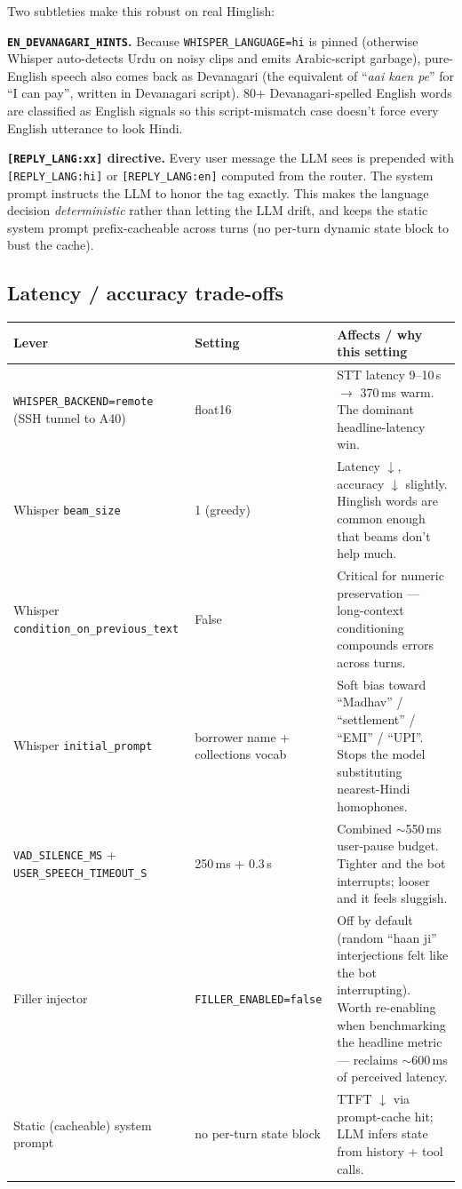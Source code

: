 \documentclass[11pt,a4paper]{article}
\begin{document}
Two subtleties make this robust on real Hinglish:

\textbf{\texttt{EN\_DEVANAGARI\_HINTS}.} Because \texttt{WHISPER\_LANGUAGE=hi} is pinned (otherwise Whisper auto-detects Urdu on noisy clips and emits Arabic-script garbage), pure-English speech also comes back as Devanagari (the equivalent of ``\textit{aai kaen pe}'' for ``I can pay'', written in Devanagari script). 80+ Devanagari-spelled English words are classified as English signals so this script-mismatch case doesn't force every English utterance to look Hindi.

\textbf{\texttt{[REPLY\_LANG:xx]} directive.} Every user message the LLM sees is prepended with \texttt{[REPLY\_LANG:hi]} or \texttt{[REPLY\_LANG:en]} computed from the router. The system prompt instructs the LLM to honor the tag exactly. This makes the language decision \emph{deterministic} rather than letting the LLM drift, and keeps the static system prompt prefix-cacheable across turns (no per-turn dynamic state block to bust the cache).

\subsection*{Latency / accuracy trade-offs}

\begin{tabular}{@{}p{4.5cm} p{4.0cm} p{6.5cm}@{}}
\toprule
\textbf{Lever} & \textbf{Setting} & \textbf{Affects / why this setting}\\
\midrule
\texttt{WHISPER\_BACKEND=remote} (SSH tunnel to A40) & float16 & STT latency 9--10\,s $\rightarrow$ 370\,ms warm. The dominant headline-latency win.\\
Whisper \texttt{beam\_size} & 1 (greedy) & Latency $\downarrow$, accuracy $\downarrow$ slightly. Hinglish words are common enough that beams don't help much.\\
Whisper \texttt{condition\_on\_previous\_text} & False & Critical for numeric preservation --- long-context conditioning compounds errors across turns.\\
Whisper \texttt{initial\_prompt} & borrower name + collections vocab & Soft bias toward ``Madhav'' / ``settlement'' / ``EMI'' / ``UPI''. Stops the model substituting nearest-Hindi homophones.\\
\texttt{VAD\_SILENCE\_MS} + \texttt{USER\_SPEECH\_TIMEOUT\_S} & 250\,ms + 0.3\,s & Combined $\sim$550\,ms user-pause budget. Tighter and the bot interrupts; looser and it feels sluggish.\\
Filler injector & \texttt{FILLER\_ENABLED=false} & Off by default (random ``haan ji'' interjections felt like the bot interrupting). Worth re-enabling when benchmarking the headline metric --- reclaims $\sim$600\,ms of perceived latency.\\
Static (cacheable) system prompt & no per-turn state block & TTFT $\downarrow$ via prompt-cache hit; LLM infers state from history + tool calls.\\
\bottomrule
\end{tabular}
\end{document}
